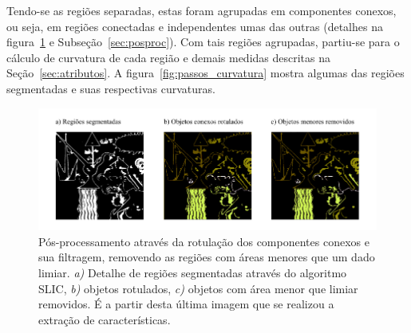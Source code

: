 Tendo-se as regiões separadas, estas foram agrupadas em componentes
conexos, ou seja, em regiões conectadas e independentes umas das
outras (detalhes na figura~\ref{fig:rotulacao} e
Subseção~\ref{sec:posproc}). Com tais regiões agrupadas, partiu-se
para o cálculo de curvatura de cada região e demais medidas descritas
na Seção~\ref{sec:atributos}. A figura~\ref{fig:passos_curvatura} mostra algumas das regiões segmentadas e suas respectivas curvaturas.

\begin{figure}[ht!]
\begin{center}
          \caption{Pós-processamento através da rotulação dos componentes
        conexos e sua filtragem, removendo as regiões com áreas
        menores que um dado limiar. \textit{a)} Detalhe de regiões
        segmentadas através do algoritmo SLIC, \textit{b)} objetos
        rotulados, \textit{c)} objetos com área menor que limiar
        removidos. É a partir desta última imagem que se realizou a
        extração de características.}
        \label{fig:rotulacao}
        \includegraphics[scale=1.2]{figs/passos_rotulacao}
        \fonteminha
\end{center}
\end{figure}


